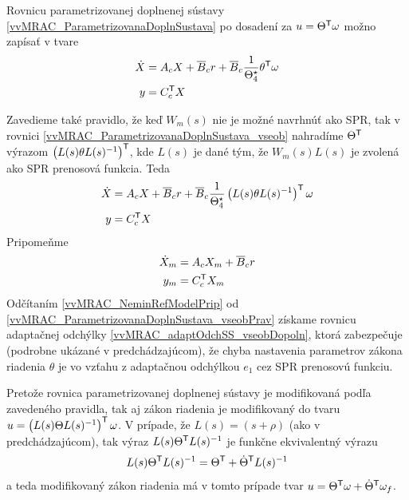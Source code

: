 ﻿\documentclass[a4paper, 10pt, ]{article}
\begin{document}
Rovnicu parametrizovanej doplnenej sústavy \eqref{vvMRAC_ParametrizovanaDoplnSustava} po dosadení za $u = \Theta^{\mathsf{T}} \omega$ možno zapísať v tvare
\begin{subequations} \label{vvMRAC_ParametrizovanaDoplnSustava_vseob}
	\begin{align}
		\dot{X} &= A_c X + \overline{B}_c r + \overline{B}_c \frac{1}{\Theta_4^\star} \theta^{\mathsf{T}} \omega \\
		y &= C_c^{\mathsf{T}} X
	\end{align}
\end{subequations}

Zavedieme také pravidlo, že keď $W_m(s)$ nie je možné navrhnúť ako SPR, tak v rovnici \eqref{vvMRAC_ParametrizovanaDoplnSustava_vseob} nahradíme $\Theta^{\mathsf{T}}$ výrazom $\left( L(s) \theta L(s)^{-1} \right)^{\mathsf{T}}$, kde $L(s)$  je dané tým, že $W_m(s)L(s)$ je zvolená ako SPR prenosová funkcia. Teda
\begin{subequations} \label{vvMRAC_ParametrizovanaDoplnSustava_vseobPrav}
	\begin{align}
		\dot{X} &= A_c X + \overline{B}_c r + \overline{B}_c \frac{1}{\Theta_4^\star} \left(  L(s)  \theta  L(s)^{-1}  \right)^{\mathsf{T}} \omega \\
		y  &= C_c^{\mathsf{T}} X
	\end{align}
\end{subequations}
Pripomeňme
\begin{subequations} \label{vvMRAC_NeminRefModelPrip}
	\begin{align}
		\dot{X}_m &= A_c X_m + \overline{B}_c r \\
		y_m &= C_c^{\mathsf{T}} X_m
	\end{align}
\end{subequations}
Odčítaním \eqref{vvMRAC_NeminRefModelPrip} od \eqref{vvMRAC_ParametrizovanaDoplnSustava_vseobPrav} získame rovnicu  adaptačnej odchýlky \eqref{vvMRAC_adaptOdchSS_vseobDopoln}, ktorá zabezpečuje (podrobne ukázané v predchádzajúcom), že chyba nastavenia parametrov zákona riadenia $\theta$ je vo vzťahu z adaptačnou odchýlkou $e_1$ cez SPR prenosovú funkciu.

Pretože rovnica parametrizovanej doplnenej sústavy je modifikovaná podľa zavedeného pravidla, tak aj zákon riadenia je modifikovaný do tvaru $u = \left( L(s) \Theta L(s)^{-1} \right)^{\mathsf{T}} \omega$. V prípade, že $L(s) = (s + \rho)$ (ako v predchádzajúcom), tak výraz $L(s) \Theta^{\mathsf{T}} L(s)^{-1}$ je funkčne ekvivalentný výrazu
\begin{equation}
	L(s) \Theta^{\mathsf{T}} L(s)^{-1} = \Theta^{\mathsf{T}} + \dot{\Theta}^{\mathsf{T}} L(s)^{-1}
\end{equation}
a teda modifikovaný zákon riadenia má v tomto prípade tvar $u = \Theta^{\mathsf{T}} \omega +  \dot{\Theta}^{\mathsf{T}} \omega_f$.
\end{document}
